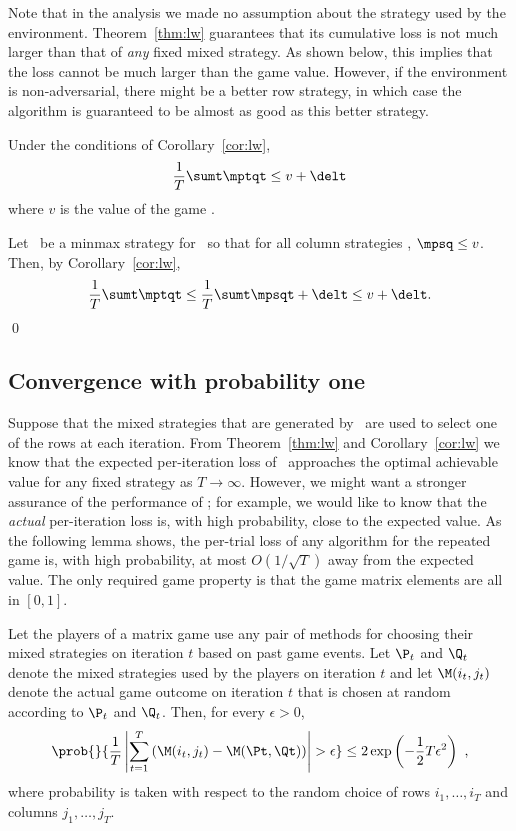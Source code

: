 Note that in the analysis we made no assumption about the strategy used
by the environment. Theorem~\ref{thm:lw} guarantees that its cumulative loss
is not much larger than that of {\em any} fixed mixed strategy.
As shown below, this implies that
the loss cannot be much larger than the game value. However,
if the environment is non-adversarial, there might be a better 
row strategy, in which case the algorithm is guaranteed
to be almost as good as this better strategy.

\begin{corollary} \label{cor:almost-min/max}
Under the conditions of Corollary~\ref{cor:lw},
\[
   \frac{1}{T} \sumt \mptqt \leq v + \delt
\]
where $v$ is the value of the game \M.
\end{corollary}

\proof
Let \Pstar\ be a minmax strategy for \M\ so that for all column strategies
\Q, $\mpsq \leq v$.
Then, by Corollary~\ref{cor:lw},
\[
   \frac{1}{T} \sumt \mptqt \leq
     \frac{1}{T} \sumt \mpsqt + \delt
  \leq v + \delt.
\]
\qed

\subsection{Convergence with probability one}

Suppose that the mixed strategies that are generated by \lwalg\ are
used to select one of the rows at each iteration. From 
Theorem~\ref{thm:lw} and Corollary~\ref{cor:lw} we know that the
expected per-iteration loss of \lwalg\ approaches the optimal
achievable value for any fixed strategy as $T \to \infty$.
However, we might want a stronger assurance of the performance of
\lwalg; for example, we would like to know that the {\em actual\/} 
per-iteration loss is, with high probability, close to the expected value.
As the following lemma shows, the per-trial loss of any algorithm for
the repeated game is, with high probability, at most $O(1/\sqrt{T})$
away from the expected value. The only required game property is that
the game matrix elements are all in $[0,1]$.

\begin{lemma} \label{lemma:azuma}
Let the players of a matrix game use any pair of methods for choosing
their mixed strategies on iteration $t$ based on past game events.
Let $\P_t$ and $\Q_t$ denote the mixed strategies used by the players
on iteration $t$ and let $\M(i_t,j_t)$ denote the actual game outcome
on iteration $t$ that is chosen at random according to $\P_t$ and $\Q_t$. 
Then, for every $\epsilon>0$,
\[
\prob{}{{1 \over T} 
                      \left| \sum_{t=1}^T \paren{\M(i_t,j_t) - \M(\Pt,\Qt)}
                      \right| > \epsilon
                     }
\leq 2 \exp \left( -{1 \over 2} T \epsilon^2 \right)~,
\]
where probability is taken with respect to the random choice of rows
${i_1,\ldots,i_T}$ and columns ${j_1,\ldots,j_T}$.
\end{lemma}

